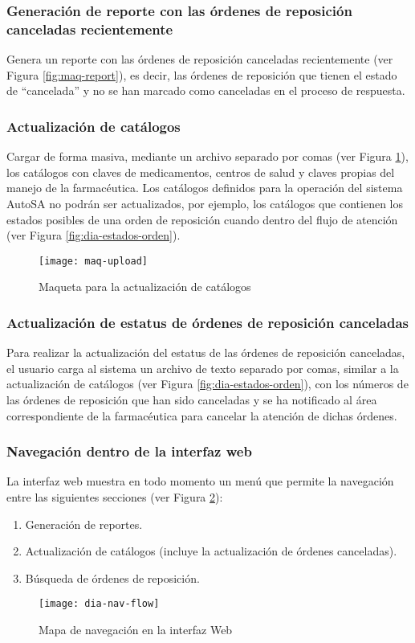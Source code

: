 \subsubsection{Generación de reporte con las órdenes de reposición canceladas recientemente}\label{sec:req-rep-canceladas}
Genera un reporte con las órdenes de reposición canceladas recientemente (ver Figura \ref{fig:maq-report}), es decir, las órdenes de reposición que tienen el estado de “cancelada” y no se han marcado como canceladas en el proceso de respuesta.

\subsubsection{Actualización de catálogos}\label{sec:req-catalogos}
Cargar de forma masiva, mediante un archivo separado por comas (ver Figura \ref{fig:maq-upload}), los catálogos con claves de medicamentos, centros de salud y claves propias del manejo de la farmacéutica. Los catálogos definidos para la operación del sistema AutoSA no podrán ser actualizados, por ejemplo, los catálogos que contienen los estados posibles de una orden de reposición cuando dentro del flujo de atención (ver Figura \ref{fig:dia-estados-orden}).
\begin{figure}[h]
  \centering
  \texttt{[image: maq-upload]}
  \caption{Maqueta para la actualización de catálogos}
  \label{fig:maq-upload}
\end{figure}

\subsubsection{Actualización de estatus de órdenes de reposición canceladas}\label{sec:req-canceladas}
Para realizar la actualización del estatus de las órdenes de reposición canceladas, el usuario carga al sistema un archivo de texto separado por comas, similar a la actualización de catálogos (ver Figura \ref{fig:dia-estados-orden}), con los números de las órdenes de reposición que han sido canceladas y se ha notificado al área correspondiente de la farmacéutica para cancelar la atención de dichas órdenes.

\subsubsection{Navegación dentro de la interfaz web}\label{sec:req-nav-bar}
La interfaz web muestra en todo momento un menú que permite la navegación entre las siguientes secciones (ver Figura \ref{fig:dia-nav-flow}):
\begin{enumerate}
  \item Generación de reportes.
  \item Actualización de catálogos (incluye la actualización de órdenes canceladas).
  \item Búsqueda de órdenes de reposición.
\end{enumerate}
\begin{figure}[h]
  \centering
  \texttt{[image: dia-nav-flow]}
  \caption{Mapa de navegación en la interfaz Web}
  \label{fig:dia-nav-flow}
\end{figure}


